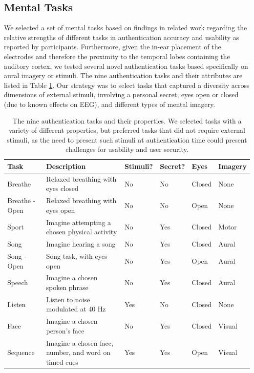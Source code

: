 \documentclass{sigchi}
\begin{document}
\subsection{Mental Tasks}

We selected a set of mental tasks based on findings in related work regarding the relative strengths of different tasks in authentication accuracy and usability as reported by participants. \cite{Chuang2013b, curran2016passthoughts} Furthermore, given the in-ear placement of the electrodes and therefore the proximity to the temporal lobes containing the auditory cortex, we tested several novel authentication tasks based specifically on aural imagery or stimuli. The nine authentication tasks and their attributes are listed in Table \ref{tab:tasks}. Our strategy was to select tasks that captured a diversity across dimensions of external stimuli, involving a personal secret, eyes open or closed (due to known effects on EEG), and different types of mental imagery.

\begin{table}[t]
\centering
\begin{tabularx}{\textwidth}{llllll}

\textbf{Task} & \textbf{Description} & \textbf{Stimuli}? & \textbf{Secret}? & \textbf{Eyes} & \textbf{Imagery}\\
\hline
Breathe & Relaxed breathing with eyes closed & No & No & Closed & None\\
Breathe - Open & Relaxed breathing with eyes open & No & No & Open & None\\
Sport & Imagine attempting a chosen physical activity & No & Yes & Closed & Motor\\
Song & Imagine hearing a song & No & Yes & Closed & Aural\\
Song - Open & Song task, with eyes open & No & Yes & Open & Aural\\
Speech & Imagine a chosen spoken phrase & No & Yes & Closed & Aural\\
Listen & Listen to noise modulated at 40 Hz & Yes & No & Closed & None\\
Face & Imagine a chosen person's face & No & Yes & Closed & Visual\\
Sequence & Imagine a chosen face, number, and word on timed cues & Yes & Yes & Open & Visual\\
\hline
\end{tabularx}
\caption{The nine authentication tasks and their properties. We selected tasks with a variety of different properties, but preferred tasks that did not require external stimuli, as the need to present such stimuli at authentication time could present challenges for usability and user security.}
\label{tab:tasks}%
\end{table}
\end{document}
